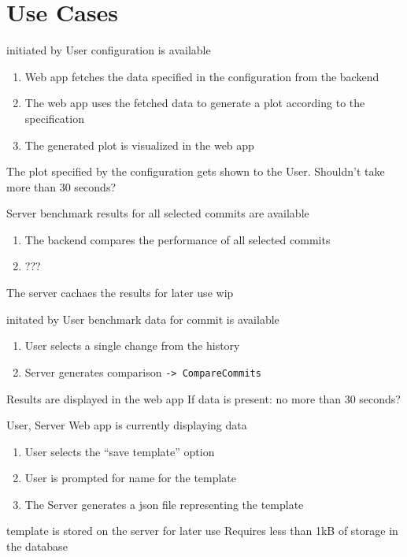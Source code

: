 \section{Use Cases}

{initiated by User}
{configuration is available}
{\begin{enumerate}
    \item Web app fetches the data specified in the configuration from the backend
    \item The web app uses the fetched data to generate a plot according to the specification
    \item The generated plot is visualized in the web app
\end{enumerate}}
{The plot specified by the configuration gets shown to the User.}
{Shouldn't take more than 30 seconds?}

\bigskip

{Server}
{benchmark results for all selected commits are available}
{\begin{enumerate}
    \item The backend compares the performance of all selected commits
    \item ???
\end{enumerate}}
{The server cachaes the results for later use}
{wip}

\bigskip

{initated by User}
{benchmark data for commit is available}
{\begin{enumerate}
    \item User selects a single change from the history
    \item Server generates comparison \texttt{-> CompareCommits}
\end{enumerate}}
{Results are displayed in the web app}
{If data is present: no more than 30 seconds?}

\bigskip

{User, Server}
{Web app is currently displaying data}
{\begin{enumerate}
    \item User selects the \enquote{save template} option
    \item User is prompted for name for the \gls{template}
    \item The Server generates a \acrshort{json} file representing the \gls{template}
\end{enumerate}} 
{\Gls{template} is stored on the server for later use}
{Requires less than 1kB of storage in the database}

